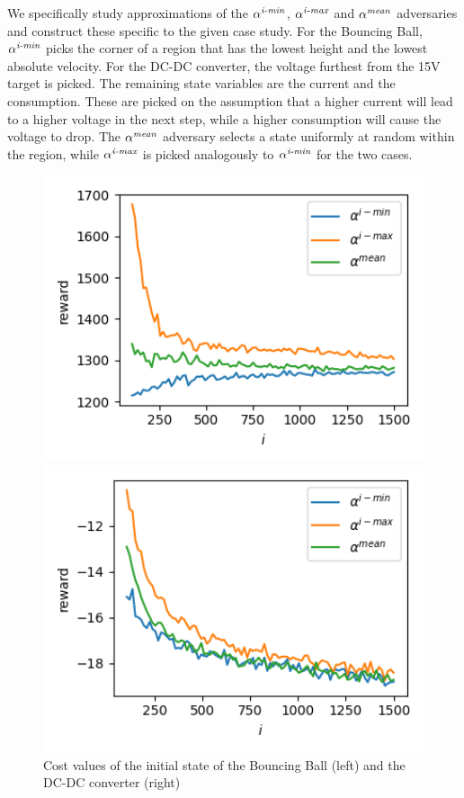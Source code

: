 \documentclass{llncs}
\begin{document}
We specifically study approximations of the $\alpha^{\emph{i-min}}$, $\alpha^{\emph{i-max}}$ and $\alpha^{\emph{mean}}$ adversaries and 
construct these specific to the given case study.
For the Bouncing Ball, $\alpha^{\emph{i-min}}$ picks the corner of a region
that has the lowest height and the lowest absolute velocity.
For the DC-DC converter, the voltage furthest from the 15V target is picked.
The remaining state variables are the current and the consumption.
These are picked on the assumption that a higher current will lead to a higher voltage in the next step,
while a higher consumption will cause the voltage to drop.
The $\alpha^{\emph{mean}}$ adversary selects a state uniformly at random within the region, while $\alpha^{\emph{i-max}}$ is picked analogously to $\alpha^{\emph{i-min}}$
for the two cases.

\begin{figure}[t]
\begin{minipage}{0.45\linewidth}
\includegraphics[width=1\textwidth]{./Figures/BB.png}
\end{minipage}
\begin{minipage}{0.45\linewidth}
\includegraphics[width=1\textwidth]{./Figures/DC.png}
\end{minipage}
\caption{Cost values of the initial state of the Bouncing Ball (left) and the DC-DC converter (right)}
\label{fig:casestudies}
\end{figure}
\end{document}

